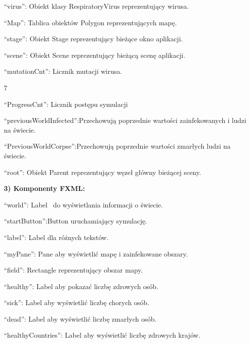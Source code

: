 \documentclass[a4paper]{article}
\begin{document}
\foreignlanguage{polish}{“virus”: Obiekt klasy RespiratoryVirus reprezentujący wirusa.}

\foreignlanguage{polish}{“Map”: Tablica obiektów Polygon reprezentujących mapę.}

\foreignlanguage{polish}{“stage”: Obiekt Stage reprezentujący bieżące okno aplikacji.}


\foreignlanguage{polish}{“scene”: Obiekt Scene reprezentujący bieżącą scenę aplikacji.}

\foreignlanguage{polish}{“mutationCnt”: Licznik mutacji wirusa.}

\begin{center}
	7
\end{center}
\newpage

\foreignlanguage{polish}{“ProgressCnt”: Licznik postępu symulacji}

\foreignlanguage{polish}{“previousWorldInfected”:Przechowują poprzednie wartości zainfekowanych i ludzi na świecie.}

\foreignlanguage{polish}{“PreviousWorldCorpse”:Przechowują poprzednie wartości  zmarłych ludzi na świecie.}

\foreignlanguage{polish}{“root”: Obiekt Parent reprezentujący węzeł główny bieżącej sceny.}
\bigskip

\foreignlanguage{polish}{\textbf{3) Komponenty FXML:}}









\foreignlanguage{polish}{“world”: Label \ do wyświetlania informacji o świecie.}



\foreignlanguage{polish}{“startButton”:Button uruchamiający symulację.}

\foreignlanguage{polish}{“label”: Label dla różnych tekstów.}

\foreignlanguage{polish}{“myPane”: Pane aby wyświetlić mapę i zainfekowane obszary.}

\foreignlanguage{polish}{“field”: Rectangle reprezentujący obszar mapy.}

\foreignlanguage{polish}{“healthy”: Label aby pokazać liczbę zdrowych osób.}

\foreignlanguage{polish}{“sick”: Label aby wyświetlić liczbę chorych osób.}

\foreignlanguage{polish}{“dead”: Label aby wyświetlić liczbę zmarłych osób.}

\foreignlanguage{polish}{“healthyCountries”: Label aby wyświetlić liczbę zdrowych krajów.}
\end{document}
